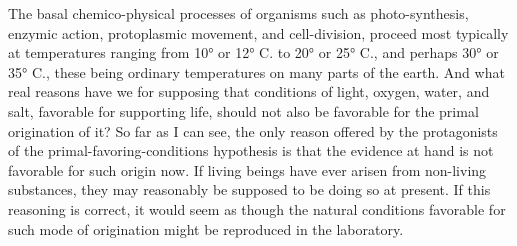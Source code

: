 \documentclass[a4paper, 11pt, oneside, polutonikogreek, english]{article}
\begin{document}
The basal chemico-physical processes of organisms such as photo-synthesis, enzymic action, protoplasmic movement, and cell-division, proceed most typically at temperatures ranging from 10° or 12° C. to 20° or 25° C., and perhaps 30° or 35° C., these being ordinary temperatures on many parts of the earth. And what real reasons have we for supposing that conditions of light, oxygen, water, and salt, favorable for supporting life, should not also be favorable for the primal origination of it? So far as I can see, the only reason offered by the protagonists of the primal-favoring-conditions hypothesis is that the evidence at hand is not favorable for such origin now. If living beings have ever arisen from non-living substances, they may reasonably be supposed to be doing so at present. If this reasoning is correct, it would seem as though the natural conditions favorable for such mode of origination might be reproduced in the laboratory.
\end{document}
